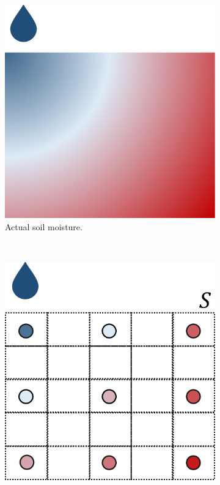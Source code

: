 \begin{figure}[t]
\centering
\begin{subfigure}[t]{.3\textwidth}
\centering
\includegraphics[scale=.15]{chapters/physics-aware/orchard/img/soil-moisture-continuous.pdf}
\caption{Actual soil moisture.}
\label{orchard-fig:moisture-cont}
\end{subfigure}~
\begin{subfigure}[t]{.3\textwidth}
\centering
\includegraphics[scale=.15]{chapters/physics-aware/orchard/img/soil-moisture-sample.pdf}

\end{subfigure}
\end{figure}
